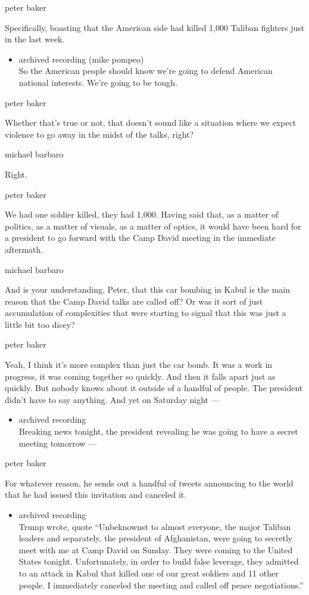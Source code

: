 peter baker

Specifically, boasting that the American side had killed 1,000 Taliban
fighters just in the last week.

\begin{itemize}
\tightlist
\item
  archived recording (mike pompeo)\\
  So the American people should know we're going to defend American
  national interests. We're going to be tough.
\end{itemize}

peter baker

Whether that's true or not, that doesn't sound like a situation where we
expect violence to go away in the midst of the talks, right?

michael barbaro

Right.

peter baker

We had one soldier killed, they had 1,000. Having said that, as a matter
of politics, as a matter of visuals, as a matter of optics, it would
have been hard for a president to go forward with the Camp David meeting
in the immediate aftermath.

michael barbaro

And is your understanding, Peter, that this car bombing in Kabul is the
main reason that the Camp David talks are called off? Or was it sort of
just accumulation of complexities that were starting to signal that this
was just a little bit too dicey?

peter baker

Yeah, I think it's more complex than just the car bomb. It was a work in
progress, it was coming together so quickly. And then it falls apart
just as quickly. But nobody knows about it outside of a handful of
people. The president didn't have to say anything. And yet on Saturday
night ---

\begin{itemize}
\tightlist
\item
  archived recording\\
  Breaking news tonight, the president revealing he was going to have a
  secret meeting tomorrow ---
\end{itemize}

peter baker

For whatever reason, he sends out a handful of tweets announcing to the
world that he had issued this invitation and canceled it.

\begin{itemize}
\tightlist
\item
  archived recording\\
  Trump wrote, quote ``Unbeknownst to almost everyone, the major Taliban
  leaders and separately, the president of Afghanistan, were going to
  secretly meet with me at Camp David on Sunday. They were coming to the
  United States tonight. Unfortunately, in order to build false
  leverage, they admitted to an attack in Kabul that killed one of our
  great soldiers and 11 other people. I immediately canceled the meeting
  and called off peace negotiations.''
\end{itemize}

